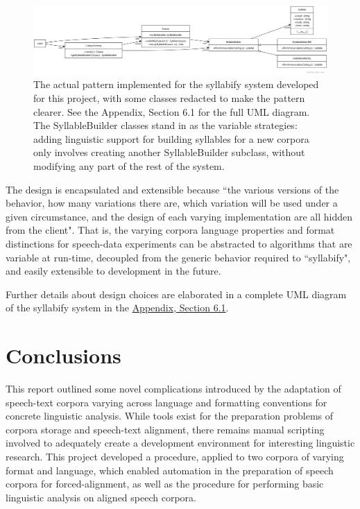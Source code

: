 \documentclass[11pt]{article}
\begin{document}
\begin{figure}[h]
  \centering
  \includegraphics[scale=0.25]{syllabify-pattern.png}
  \caption{The actual pattern implemented for the syllabify system developed for this project, with some classes redacted to make the pattern clearer. See the Appendix, Section 6.1 for the full UML diagram. The SyllableBuilder classes stand in as the variable strategies: adding linguistic support for building syllables for a new corpora only involves creating another SyllableBuilder subclass, without modifying any part of the rest of the system.}
  \label{fig:syllabify-pattern}
\end{figure}

The design is encapsulated and extensible because ``the various versions of the behavior, how many variations there are, which variation will be used under a given circumstance, and the design of each varying implementation are all hidden from the client"\cite{bain_emergent_2008}. That is, the varying corpora language properties and format distinctions for speech-data experiments can be abstracted to algorithms that are variable at run-time, decoupled from the generic behavior required to ``syllabify", and easily extensible to development in the future.

Further details about design choices are elaborated in a complete UML diagram of the syllabify system in the \hyperlink{section.6}{Appendix, Section 6.1}.

\section{Conclusions}

This report outlined some novel complications introduced by the adaptation of speech-text corpora varying across language and formatting conventions for concrete linguistic analysis. While tools exist for the preparation problems of corpora storage and speech-text alignment, there remains manual scripting involved to adequately create a development environment for interesting linguistic research. This project developed a procedure, applied to two corpora of varying format and language, which enabled automation in the preparation of speech corpora for forced-alignment, as well as the procedure for performing basic linguistic analysis on aligned speech corpora.
\end{document}
